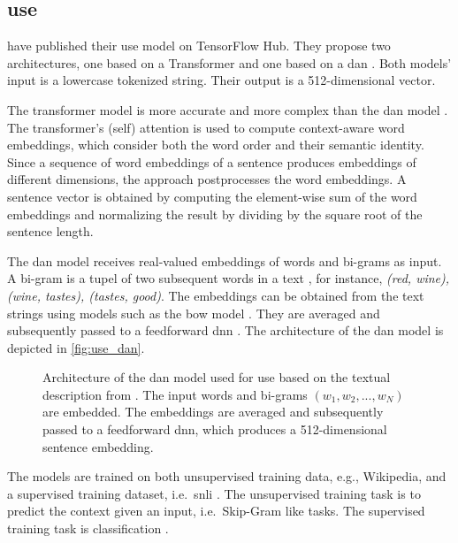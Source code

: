 \subsection{\acl*{use}}\label{subsec:univ-sent-encoder}

\citeauthor{UniversalSentEnc2018} have published their \acf{use} model on TensorFlow Hub.
They propose two architectures, one based on a Transformer and one based on a \ac{dan} \cite{UniversalSentEnc2018}.
Both models' input is a lowercase tokenized string.
Their output is a 512-dimensional vector.

The transformer model is more accurate and more complex than the \ac{dan} model \cite{UniversalSentEnc2018}.
The transformer's (self) attention is used to compute context-aware word embeddings, which consider both the word order and their semantic identity.
Since a sequence of word embeddings of a sentence produces embeddings of different dimensions, the approach postprocesses the word embeddings.
A sentence vector is obtained by computing the element-wise sum of the word embeddings 
and normalizing the result by dividing by the square root of the sentence length.

The \ac{dan} model receives real-valued embeddings of words and bi-grams as input.
A bi-gram is a tupel of two subsequent words in a text \cite{nlp-book2009}, for instance, \textit{(red, wine), (wine, tastes), (tastes, good)}.
The embeddings can be obtained from the text strings using models such as the \ac{bow} model \cite{UniversalSentEnc-dan-input-emb}.
They are averaged and subsequently passed to a feedforward \ac{dnn} \cite{UniversalSentEnc2018}.
The architecture of the \ac{dan} model is depicted in \autoref{fig:use_dan}.

\begin{figure}[!htb] %
    \centering
    
    \caption[Architecture of \acs*{use}]{Architecture of the \acs*{dan} model used for \acs*{use} based on the textual description from \cite{inferSent2018}.
    The input words and bi-grams $(w_1, w_2, ..., w_N)$ are embedded.
    The embeddings are averaged and subsequently passed to a feedforward \acs*{dnn}, which produces a 512-dimensional sentence embedding.
    }
    \label{fig:use_dan}
\end{figure}

The models are trained on both unsupervised training data, e.g., Wikipedia, and a supervised training dataset, i.e.\ \ac{snli} \cite{UniversalSentEnc2018, HfsentTrans2019}.
The unsupervised training task is to predict the context given an input, i.e.\ Skip-Gram like tasks.
The supervised training task is classification \cite{UniversalSentEnc2018}.

